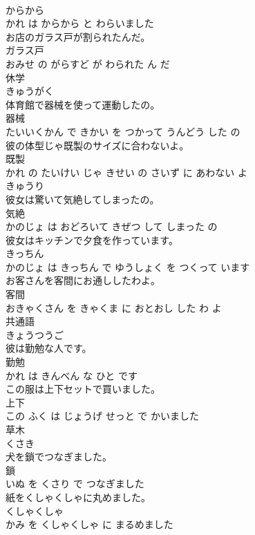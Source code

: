 \documentclass[8pt]{extreport}
\begin{document}
\begin{CJK}{UTF8}{min}
\\	からから 
\\	かれ は からから と わらいました			
\\	お店のガラス戸が割られたんだ。	
\\	ガラス戸 
\\	おみせ の がらすど が わられた ん だ			
\\	休学	
\\	きゅうがく			
\\	体育館で器械を使って運動したの。	
\\	器械 
\\	たいいくかん で きかい を つかって うんどう した の			
\\	彼の体型じゃ既製のサイズに合わないよ。	
\\	既製 
\\	かれ の たいけい じゃ きせい の さいず に あわない よ			
\\	きゅうり	
\\	彼女は驚いて気絶してしまったの。	
\\	気絶 
\\	かのじょ は おどろいて きぜつ して しまった の			
\\	彼女はキッチンで夕食を作っています。	
\\	きっちん 
\\	かのじょ は きっちん で ゆうしょく を つくって います			
\\	お客さんを客間にお通ししたわよ。	
\\	客間 
\\	おきゃくさん を きゃくま に おとおし した わ よ			
\\	共通語	
\\	きょうつうご			
\\	彼は勤勉な人です。	
\\	勤勉 
\\	かれ は きんべん な ひと です			
\\	この服は上下セットで買いました。	
\\	上下 
\\	この ふく は じょうげ せっと で かいました			
\\	草木	
\\	くさき			
\\	犬を鎖でつなぎました。	
\\	鎖 
\\	いぬ を くさり で つなぎました			
\\	紙をくしゃくしゃに丸めました。	
\\	くしゃくしゃ 
\\	かみ を くしゃくしゃ に まるめました			

\end{CJK}
\end{document}

